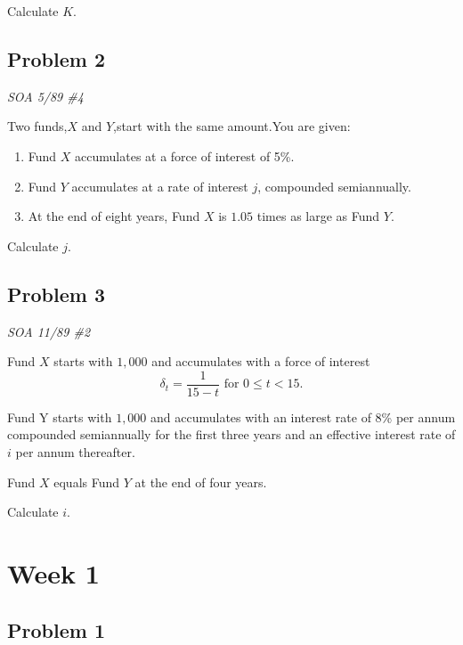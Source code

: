 \documentclass[
]{book}
\begin{document}
Calculate \(K\).

\hypertarget{problem-2-1}{%
\subsection*{Problem 2}\label{problem-2-1}}

\emph{SOA 5/89 \#4}

Two funds,\(X\) and \(Y\),start with the same amount.You are given:

\begin{enumerate}
\def\labelenumi{\arabic{enumi}.}
\item
  Fund \(X\) accumulates at a force of interest of 5\%.
\item
  Fund \(Y\) accumulates at a rate of interest \(j\), compounded semiannually.
\item
  At the end of eight years, Fund \(X\) is \(1.05\) times as large as Fund \(Y\).
\end{enumerate}

Calculate \(j\).

\hypertarget{problem-3-1}{%
\subsection*{Problem 3}\label{problem-3-1}}

\emph{SOA 11/89 \#2}

Fund \(X\) starts with \(1,000\) and accumulates with a force of interest \[\delta_{t}=\frac{1}{15-t} \text{ for } 0 \le t< 15.\]

Fund Y starts with \(1,000\) and accumulates with an interest rate of 8\% per annum compounded semiannually for the first three years and an effective interest rate of \(i\) per annum thereafter.

Fund \(X\) equals Fund \(Y\) at the end of four years.

Calculate \(i\).

\hypertarget{week-1}{%
\section*{Week 1}\label{week-1}}

\hypertarget{problem-1-2}{%
\subsection*{Problem 1}\label{problem-1-2}}
\end{document}
